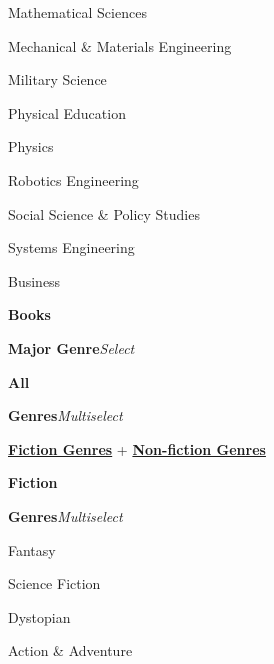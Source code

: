 \begin{CompactItemize}
\begin{CompactItemize}
\begin{CompactItemize}
\begin{CompactItemize}
                \item Mathematical Sciences
                \item Mechanical \& Materials Engineering
                \item Military Science
                \item Physical Education
                \item Physics
                \item Robotics Engineering
                \item Social Science \& Policy Studies
                \item Systems Engineering
                \item Business
            \end{CompactItemize}
        \end{CompactItemize}
        \item \textbf{Books}
        \begin{CompactItemize}
            \item \textbf{Major Genre}\quad\textit{Select}
            \begin{CompactItemize}
                \item \textbf{All}
                \begin{CompactItemize}
                    \item \textbf{Genres}\quad\textit{Multiselect}
                    \begin{CompactItemize}
                        \item \hyperref[cco:fiction_genres]{\textbf{Fiction Genres}} + \hyperref[cco:nonfiction_genres]{\textbf{Non-fiction Genres}}
                    \end{CompactItemize}
                \end{CompactItemize}
                \item \textbf{Fiction}
                \begin{CompactItemize}
                    \item\label{cco:fiction_genres} \textbf{Genres}\quad\textit{Multiselect}
                    \begin{CompactItemize}
                        \item Fantasy
                        \item Science Fiction
                        \item Dystopian
                        \item Action \& Adventure

\end{CompactItemize}
\end{CompactItemize}
\end{CompactItemize}
\end{CompactItemize}
\end{CompactItemize}
\end{CompactItemize}
